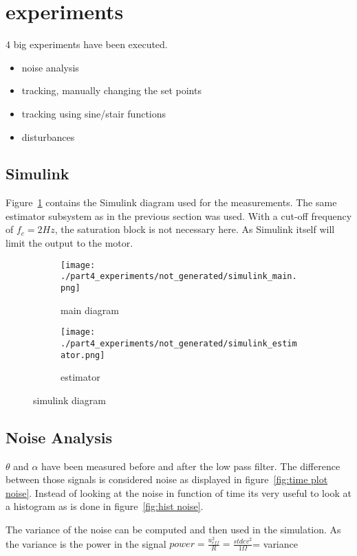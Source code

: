 \section{experiments}

	4 big experiments have been executed.
	
	\begin{itemize}
		\item noise analysis
		\item tracking, manually changing the set points
		\item tracking using sine/stair functions
		\item disturbances
	\end{itemize}

\subsection{Simulink}
Figure~\ref{fig:simulink measurement diagram} contains the Simulink diagram used for the measurements. The same estimator subsystem as in the previous section was used. With a cut-off frequency of $f_c=2Hz$, the saturation block is not necessary here. As Simulink itself will limit the output to the motor.
	\begin{figure}[H]
	\centering
	\begin{subfigure}[b]{0.55\textwidth}
		\texttt{[image: ./part4\_experiments/not\_generated/simulink\_main.png]}
		\caption{main diagram}
	\end{subfigure}
	\begin{subfigure}[b]{0.45\textwidth}
		\texttt{[image: ./part4\_experiments/not\_generated/simulink\_estimator.png]}
		\caption{estimator}
	\end{subfigure}
	\caption{simulink diagram}
	\label{fig:simulink measurement diagram}
\end{figure}
\subsection{Noise Analysis}
	$\theta$ and $\alpha$ have been measured before and after the low pass filter. The difference between those signals is considered noise as displayed in figure~\ref{fig:time plot noise}. Instead of looking at the noise in function of time its very useful to look at a histogram as is done in figure~\ref{fig:hist noise}.
	
	The variance of the noise can be computed and then used in the simulation. As the variance is the power in the signal $power = \frac{u_{eff}^2}{R} = \frac{stdev^2}{1 \Omega}$= variance
	

